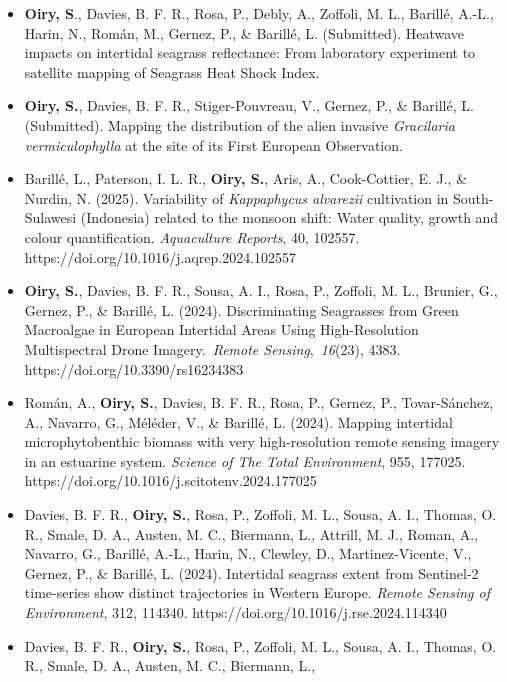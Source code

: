 \documentclass[
  letterpaper,
  11pt,
  english,
  singlespacing,
  headsepline]{MastersDoctoralThesis}
\begin{document}
\begin{itemize}
\item
  \textbf{Oiry, S}., Davies, B. F. R., Rosa, P., Debly, A., Zoffoli, M.
  L., Barillé, A.-L., Harin, N., Román, M., Gernez, P., \& Barillé, L.
  (Submitted). Heatwave impacts on intertidal seagrass reflectance: From
  laboratory experiment to satellite mapping of Seagrass Heat Shock
  Index.
\item
  \textbf{Oiry, S.}, Davies, B. F. R., Stiger-Pouvreau, V., Gernez, P.,
  \& Barillé, L. (Submitted). Mapping the distribution of the alien
  invasive \emph{Gracilaria vermiculophylla} at the site of its First
  European Observation.
\item
  Barillé, L., Paterson, I. L. R., \textbf{Oiry, S.}, Aris, A.,
  Cook-Cottier, E. J., \& Nurdin, N. (2025). Variability of
  \emph{Kappaphycus alvarezii} cultivation in South-Sulawesi (Indonesia)
  related to the monsoon shift: Water quality, growth and colour
  quantification. \emph{Aquaculture Reports}, 40, 102557.
  https://doi.org/10.1016/j.aqrep.2024.102557
\item
  \textbf{Oiry, S.}, Davies, B. F. R., Sousa, A. I., Rosa, P., Zoffoli,
  M. L., Brunier, G., Gernez, P., \& Barillé, L. (2024). Discriminating
  Seagrasses from Green Macroalgae in European Intertidal Areas Using
  High-Resolution Multispectral Drone Imagery.~\emph{Remote
  Sensing},~\emph{16}(23), 4383. https://doi.org/10.3390/rs16234383
\item
  Román, A., \textbf{Oiry, S.}, Davies, B. F. R., Rosa, P., Gernez, P.,
  Tovar-Sánchez, A., Navarro, G., Méléder, V., \& Barillé, L. (2024).
  Mapping intertidal microphytobenthic biomass with very high-resolution
  remote sensing imagery in an estuarine system. \emph{Science of The
  Total Environment}, 955, 177025.
  https://doi.org/10.1016/j.scitotenv.2024.177025
\item
  Davies, B. F. R., \textbf{Oiry, S.}, Rosa, P., Zoffoli, M. L., Sousa,
  A. I., Thomas, O. R., Smale, D. A., Austen, M. C., Biermann, L.,
  Attrill, M. J., Roman, A., Navarro, G., Barillé, A.-L., Harin, N.,
  Clewley, D., Martinez-Vicente, V., Gernez, P., \& Barillé, L. (2024).
  Intertidal seagrass extent from Sentinel-2 time-series show distinct
  trajectories in Western Europe. \emph{Remote Sensing of Environment},
  312, 114340. https://doi.org/10.1016/j.rse.2024.114340
\item
  Davies, B. F. R., \textbf{Oiry, S.}, Rosa, P., Zoffoli, M. L., Sousa,
  A. I., Thomas, O. R., Smale, D. A., Austen, M. C., Biermann, L.,

\end{itemize}
\end{document}
